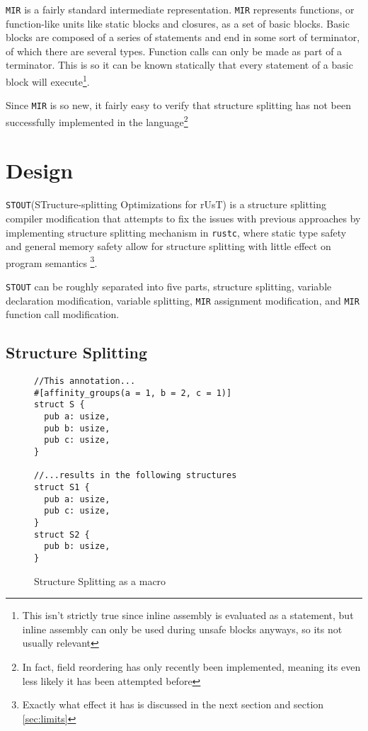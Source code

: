 \documentclass[12pt,oneside]{book}
\newcommand{\rustcname}{{\texttt{rustc}}}
\def \rustc {\rustcname{}\xspace}
\newcommand{\mirname}{{\texttt{MIR}}}
\def \mir {\mirname{}\xspace}
\newcommand{\projectname}{{\texttt{STOUT}}}
\def \name{\projectname\xspace}
\begin{document}
\mir is a fairly standard intermediate representation. \mir represents functions, 
or function-like units like static blocks and closures, 
as a set of basic blocks. Basic blocks are composed of a series of statements
and end in some sort of terminator, of which there are several types. 
Function calls can only be made as part of a terminator. This is
so it can be known statically that every statement of a basic block will
execute\footnote{This isn't strictly true since inline assembly is evaluated as
  a statement, but inline assembly can only be used during unsafe blocks
  anyways, so its not usually relevant}.

  Since \mir is so new, it fairly easy to verify that structure splitting has
  not been successfully implemented in the language\footnote{In fact, field
  reordering has only recently been implemented, meaning its even less
  likely it has been attempted before}

\chapter{Design}

\name (STructure-splitting Optimizations for rUsT) is a structure 
splitting compiler modification that attempts to fix the issues with
previous approaches by implementing structure splitting 
mechanism in \rustc, where static type
safety and general memory safety allow for 
structure splitting with little effect on program
semantics
\footnote{Exactly what effect it has is discussed in the next section and section \ref{sec:limits}}.

\name can be roughly separated into five parts, structure splitting, variable
declaration modification, variable splitting, \mir assignment modification, 
and \mir function call modification.

\section{Structure Splitting}

\begin{figure*}
\begin{verbatim}
//This annotation...
#[affinity_groups(a = 1, b = 2, c = 1)]
struct S {
  pub a: usize,
  pub b: usize,
  pub c: usize,
}

//...results in the following structures
struct S1 {
  pub a: usize,
  pub c: usize,
}
struct S2 {
  pub b: usize,
}
\end{verbatim}
  \caption{Structure Splitting as a macro}
  \label{fig:split}
\end{figure*}
\end{document}
